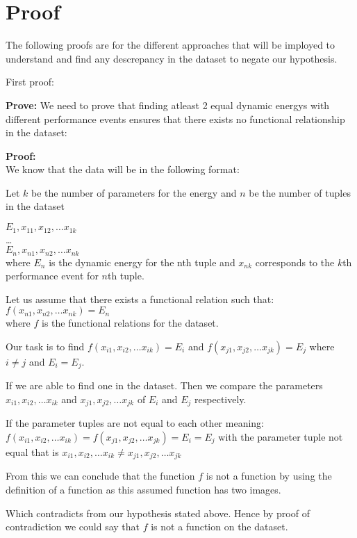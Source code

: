 \section{Proof}
The following proofs are for the different approaches that will be imployed to understand and find any descrepancy in the dataset to negate our hypothesis.

First proof:

\textbf{Prove:} We need to prove that finding atleast 2 equal dynamic energys with different performance events ensures that there exists no functional relationship in the dataset:

\textbf{Proof:}\\We know that the data will be in the following format:

Let \(k\) be the number of parameters for the energy and \(n\) be the number of tuples in the dataset

\(E_1,x_{11}, x_{12}, \ldots x_{1k}\)\\
\ldots\\
\(E_n,x_{n1}, x_{n2}, \ldots x_{nk}\)\\
where \(E_n\) is the dynamic energy for the nth tuple and \(x_{nk}\) corresponds to the \(k\)th performance event for \(n\)th tuple.

Let us assume that there exists a functional relation such that:\\
\(f(x_{n1}, x_{n2}, \ldots x_{nk}) = E_n\)\\
where \(f\) is the functional relations for the dataset.

Our task is to find \(f(x_{i1}, x_{i2}, \ldots x_{ik}) = E_i\) and \(f(x_{j1}, x_{j2}, \ldots x_{jk}) = E_j\) 
where \(i \neq j\) and \(E_i = E_j\).

If we are able to find one in the dataset.
Then we compare the parameters \(x_{i1}, x_{i2}, \ldots x_{ik}\) and \(x_{j1}, x_{j2}, \ldots x_{jk}\) of \(E_i\) and \(E_j\) respectively.

If the parameter tuples are not equal to each other meaning:\\
\(f(x_{i1}, x_{i2}, \ldots x_{ik}) = f(x_{j1}, x_{j2}, \ldots x_{jk}) = E_i = E_j\) with the parameter tuple not equal that is \(x_{i1}, x_{i2}, \ldots x_{ik} \neq x_{j1}, x_{j2}, \ldots x_{jk}\)

From this we can conclude that the function \(f\) is not a function by using the definition of a function as this assumed function has two images.

Which contradicts from our hypothesis stated above.
Hence by proof of contradiction we could say that \(f\) is not a function on the dataset.

